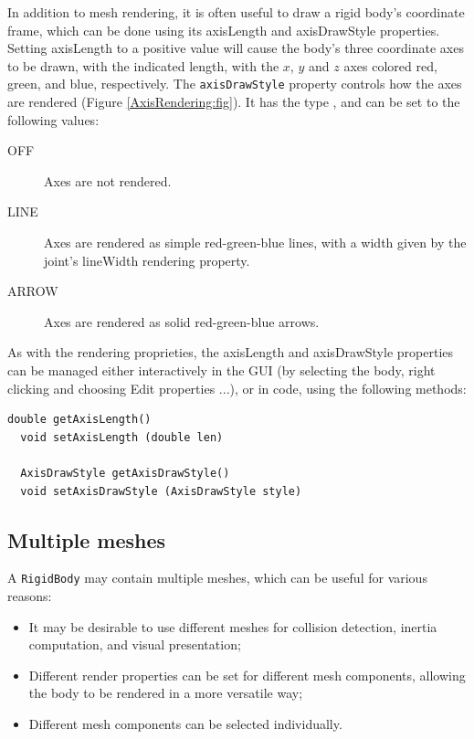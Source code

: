 In addition to mesh rendering, it is often useful to draw a rigid
body's coordinate frame, which can be done using its {\sf axisLength}
and {\sf axisDrawStyle} properties. Setting {\sf axisLength} to a
positive value will cause the body's three coordinate axes to be
drawn, with the indicated length, with the $x$, $y$ and $z$ axes
colored red, green, and blue, respectively. The {\tt axisDrawStyle}
property controls how the axes are rendered (Figure
\ref{AxisRendering:fig}). It has the type
, and can
be set to the following values:
%
\begin{description}

\item[OFF]\mbox{}

Axes are not rendered.

\item[LINE]\mbox{}

Axes are rendered as simple red-green-blue lines,
with a width given by the joint's {\sf lineWidth} rendering property.

\item[ARROW]\mbox{}

Axes are rendered as solid red-green-blue arrows.

\end{description}
%

As with the rendering proprieties, the {\sf axisLength} and {\sf
axisDrawStyle} properties can be managed either interactively in the
GUI (by selecting the body, right clicking and choosing {\sf Edit
properties ...}), or in code, using the following methods:
%
\begin{lstlisting}[]
  double getAxisLength()
  void setAxisLength (double len)

  AxisDrawStyle getAxisDrawStyle()
  void setAxisDrawStyle (AxisDrawStyle style)
\end{lstlisting}
%

\subsection{Multiple meshes}
\label{rigidBodyMultipleMeshes:sec}

A {\tt RigidBody} may contain multiple meshes, which can be useful for
various reasons:

\begin{itemize}

\item It may be desirable to use different meshes for collision
detection, inertia computation, and visual presentation;

\item Different render properties can be set for different mesh
components, allowing the body to be rendered in a more versatile way;

\item Different mesh components can be selected individually.

\end{itemize}

